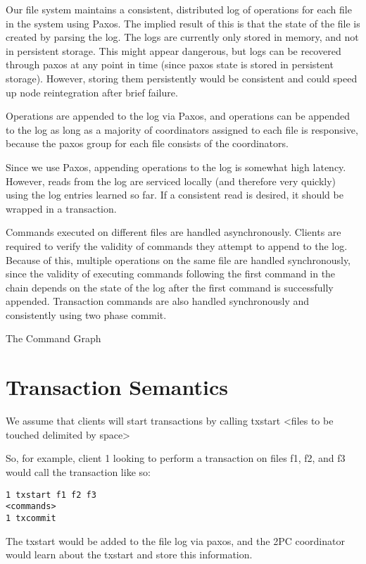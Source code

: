 \documentclass[11pt]{article}
\begin{document}
Our file system maintains a consistent, distributed log of operations for each file in the system using Paxos. The implied result of this is that the state of the file is created by parsing the log.
The logs are currently only stored in memory, and not in persistent storage. This might appear dangerous, but logs can be recovered through paxos at any point in time (since paxos state is stored in persistent storage).  However, storing them persistently would be consistent and could speed up node reintegration after brief failure.

Operations are appended to the log via Paxos, and operations can be appended to the log as long as a majority of coordinators assigned to each file is responsive, because the paxos group for each file consists of the coordinators.

Since we use Paxos, appending operations to the log is somewhat high latency.
However, reads from the log are serviced locally (and therefore very quickly) using the log entries learned so far.
If a consistent read is desired, it should be wrapped in a transaction.

Commands executed on different files are handled asynchronously.
Clients are required to verify the validity of commands they attempt to append to the log. 
Because of this, multiple operations on the same file are handled synchronously, since the validity of executing commands
following the first command in the chain depends on the state of the log after the first command is successfully appended.
Transaction commands are also handled synchronously and consistently using two phase commit.

The Command Graph

\section{Transaction Semantics}
We assume that clients will start transactions by calling txstart <files to be touched delimited by space>

So, for example, client 1 looking to perform a transaction on files f1, f2, and f3 would call the transaction like so:

\begin{verbatim}
1 txstart f1 f2 f3
<commands>
1 txcommit
\end{verbatim}

The txstart would be added to the file log via paxos, and the 2PC coordinator would learn about the txstart and store this information.
\end{document}
